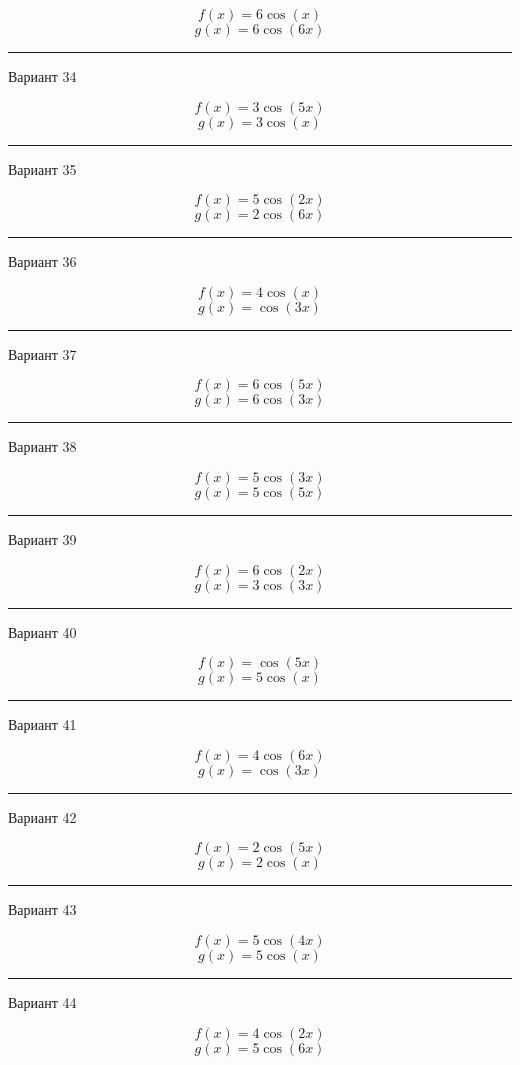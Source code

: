 \documentclass[11pt]{report}
\begin{document}
$$f(x)=6 \cos{\left(x \right)}$$
$$g(x)=6 \cos{\left(6 x \right)}$$

\rule{\textwidth}{.2mm}

Вариант 34

$$f(x)=3 \cos{\left(5 x \right)}$$
$$g(x)=3 \cos{\left(x \right)}$$

\rule{\textwidth}{.2mm}

Вариант 35

$$f(x)=5 \cos{\left(2 x \right)}$$
$$g(x)=2 \cos{\left(6 x \right)}$$

\rule{\textwidth}{.2mm}

Вариант 36

$$f(x)=4 \cos{\left(x \right)}$$
$$g(x)=\cos{\left(3 x \right)}$$

\rule{\textwidth}{.2mm}

Вариант 37

$$f(x)=6 \cos{\left(5 x \right)}$$
$$g(x)=6 \cos{\left(3 x \right)}$$

\rule{\textwidth}{.2mm}

Вариант 38

$$f(x)=5 \cos{\left(3 x \right)}$$
$$g(x)=5 \cos{\left(5 x \right)}$$

\rule{\textwidth}{.2mm}

Вариант 39

$$f(x)=6 \cos{\left(2 x \right)}$$
$$g(x)=3 \cos{\left(3 x \right)}$$

\rule{\textwidth}{.2mm}

Вариант 40

$$f(x)=\cos{\left(5 x \right)}$$
$$g(x)=5 \cos{\left(x \right)}$$

\rule{\textwidth}{.2mm}

Вариант 41

$$f(x)=4 \cos{\left(6 x \right)}$$
$$g(x)=\cos{\left(3 x \right)}$$

\rule{\textwidth}{.2mm}

Вариант 42

$$f(x)=2 \cos{\left(5 x \right)}$$
$$g(x)=2 \cos{\left(x \right)}$$

\rule{\textwidth}{.2mm}

Вариант 43

$$f(x)=5 \cos{\left(4 x \right)}$$
$$g(x)=5 \cos{\left(x \right)}$$

\rule{\textwidth}{.2mm}

Вариант 44

$$f(x)=4 \cos{\left(2 x \right)}$$
$$g(x)=5 \cos{\left(6 x \right)}$$
\end{document}
